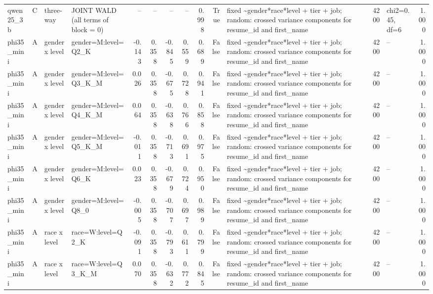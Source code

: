\begin{tabular}{llllrrrrrrlrlr}
qwen25\_3b & C & three-way & JOINT WALD (all terms of block = 0) & -- & -- & -- & -- & 0.998 & True & fixed \textasciitilde \space gender*race*level + tier + job; random: crossed variance components for resume\_id and first\_name & 4200 & chi2=0.45, df=6 & 1.000 \\
phi35\_mini & A & gender x level & gender=M:level=Q2\_K & -0.143 & 0.358 & -0.845 & 0.559 & 0.689 & False & fixed \textasciitilde \space gender*race*level + tier + job; random: crossed variance components for resume\_id and first\_name & 4200 & -- & 1.000 \\
phi35\_mini & A & gender x level & gender=M:level=Q3\_K\_M & 0.026 & 0.358 & -0.675 & 0.728 & 0.941 & False & fixed \textasciitilde \space gender*race*level + tier + job; random: crossed variance components for resume\_id and first\_name & 4200 & -- & 1.000 \\
phi35\_mini & A & gender x level & gender=M:level=Q4\_K\_M & 0.064 & 0.358 & -0.638 & 0.766 & 0.858 & False & fixed \textasciitilde \space gender*race*level + tier + job; random: crossed variance components for resume\_id and first\_name & 4200 & -- & 1.000 \\
phi35\_mini & A & gender x level & gender=M:level=Q5\_K\_M & -0.011 & 0.358 & -0.713 & 0.691 & 0.975 & False & fixed \textasciitilde \space gender*race*level + tier + job; random: crossed variance components for resume\_id and first\_name & 4200 & -- & 1.000 \\
phi35\_mini & A & gender x level & gender=M:level=Q6\_K & 0.023 & 0.358 & -0.679 & 0.724 & 0.950 & False & fixed \textasciitilde \space gender*race*level + tier + job; random: crossed variance components for resume\_id and first\_name & 4200 & -- & 1.000 \\
phi35\_mini & A & gender x level & gender=M:level=Q8\_0 & -0.005 & 0.358 & -0.707 & 0.697 & 0.989 & False & fixed \textasciitilde \space gender*race*level + tier + job; random: crossed variance components for resume\_id and first\_name & 4200 & -- & 1.000 \\
phi35\_mini & A & race x level & race=W:level=Q2\_K & -0.091 & 0.358 & -0.793 & 0.611 & 0.799 & False & fixed \textasciitilde \space gender*race*level + tier + job; random: crossed variance components for resume\_id and first\_name & 4200 & -- & 1.000 \\
phi35\_mini & A & race x level & race=W:level=Q3\_K\_M & 0.070 & 0.358 & -0.632 & 0.772 & 0.845 & False & fixed \textasciitilde \space gender*race*level + tier + job; random: crossed variance components for resume\_id and first\_name & 4200 & -- & 1.000 \\

\end{tabular}
